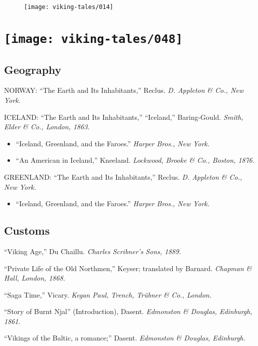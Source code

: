 \begin{figure}[hb]
    \centering
    \vskip8pt
    \texttt{[image: viking-tales/014]}
\end{figure}

\section[A Reading List]{
    \texttt{[image: viking-tales/048]}}

\subsection*{Geography}

NORWAY: ``The Earth and Its Inhabitants,'' Reclus. \emph{D. Appleton \&
Co., New York.}

\noindent ICELAND: ``The Earth and Its Inhabitants,'' ``Iceland,''
Baring-Gould. \emph{Smith, Elder \& Co., London, 1863.}

\begin{itemize}
\item ``Iceland, Greenland, and the Faroes.'' \emph{Harper Bros., New York.}
\item ``An American in Iceland,'' Kneeland. \emph{Lockwood, Brooke \& Co., Boston,
1876.}
\end{itemize}

\noindent GREENLAND: ``The Earth and Its Inhabitants,'' Reclus. \emph{D.
Appleton \& Co., New York.}

\begin{itemize}
\item ``Iceland, Greenland, and the Faroes.'' \emph{Harper Bros., New York.}
\end{itemize}

\subsection*{Customs}

``Viking Age,'' Du Chaillu. \emph{Charles Scribner's Sons, 1889.}

\noindent``Private Life of the Old Northmen,'' Keyser; translated by
Barnard. \emph{Chapman \& Hall, London, 1868.}

\noindent ``Saga Time,'' Vicary. \emph{Kegan Paul, Trench, Trübner \&
Co., London.}

\noindent ``Story of Burnt Njal'' (Introduction), Dasent. \emph{Edmonston
\& Douglas, Edinburgh, 1861.}

\noindent ``Vikings of the Baltic, a romance;'' Dasent. \emph{Edmonston
\& Douglas, Edinburgh.}

